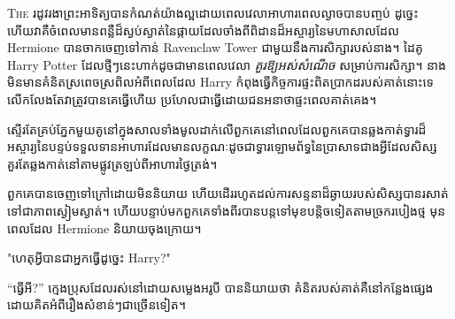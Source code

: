 
\lettrine{T}{he} រដូវរងាព្រះអាទិត្យបានកំណត់យ៉ាងល្អដោយពេលវេលាអាហារពេលល្ងាចបានបញ្ចប់ ដូច្នេះហើយវាគឺចំពេលមានពន្លឺដ៏ស្ងប់ស្ងាត់នៃផ្កាយដែលចាំងពីពិដានដ៏អស្ចារ្យនៃមហាសាលដែល Hermione បានចាកចេញទៅកាន់ Ravenclaw Tower ជាមួយនឹងការសិក្សារបស់នាង។ ដៃគូ Harry Potter ដែលថ្មីៗនេះហាក់ដូចជាមានពេលវេលា \emph{គួរឱ្យអស់សំណើច} សម្រាប់ការសិក្សា។ នាង​មិន​មាន​គំនិត​ស្រពេចស្រពិល​អំពី​ពេល​ដែល Harry កំពុង​ធ្វើ​កិច្ចការ​ផ្ទះ​ពិត​ប្រាកដ​របស់​គាត់​នោះ​ទេ លើក​លែង​តែ​វា​ត្រូវ​បាន​គេ​ធ្វើ​ហើយ ប្រហែល​ជា​ធ្វើ​ដោយ​ជន​អនាថា​ផ្ទះ​ពេល​គាត់​គេង។

ស្ទើរតែគ្រប់ភ្នែកមួយគូនៅក្នុងសាលទាំងមូលដាក់លើពួកគេនៅពេលដែលពួកគេបានឆ្លងកាត់ទ្វារដ៏អស្ចារ្យនៃបន្ទប់ទទួលទានអាហារដែលមានលក្ខណៈដូចជាទ្វារឡោមព័ទ្ធនៃប្រាសាទជាងអ្វីដែលសិស្សគួរតែឆ្លងកាត់នៅតាមផ្លូវត្រឡប់ពីអាហារថ្ងៃត្រង់។

ពួកគេបានចេញទៅក្រៅដោយមិននិយាយ ហើយដើររហូតដល់ការសន្ទនាដ៏ឆ្ងាយរបស់សិស្សបានរសាត់ទៅជាភាពស្ងៀមស្ងាត់។ ហើយបន្ទាប់មកពួកគេទាំងពីរបានបន្តទៅមុខបន្តិចទៀតតាមច្រករបៀងថ្ម មុនពេលដែល Hermione និយាយចុងក្រោយ។

"ហេតុអ្វីបានជាអ្នកធ្វើដូច្នេះ Harry?"

“ធ្វើអី?” ក្មេងប្រុសដែលរស់នៅដោយសម្លេងអរូបី បាននិយាយថា គំនិតរបស់គាត់គឺនៅកន្លែងផ្សេង ដោយគិតអំពីរឿងសំខាន់ៗជាច្រើនទៀត។

